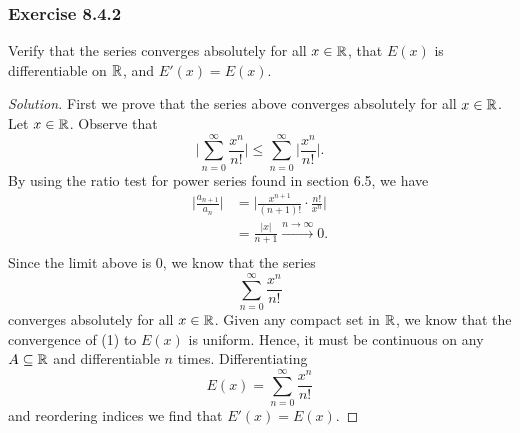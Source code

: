 \subsubsection{Exercise 8.4.2} Verify that the series converges absolutely for all \( x \in \mathbb{R}  \), that \( E(x)  \) is differentiable on \( \mathbb{R}  \), and \( E'(x) = E(x)  \).
\begin{proof}[Solution]
First we prove that the series above converges absolutely for all \( x \in \mathbb{R}  \). Let \( x \in \mathbb{R}  \). Observe that 
\[  \Big| \sum_{ n=0  }^{ \infty  } \frac{ x^{n}  }{  n!  }  \Big| \leq \sum_{ n=0  }^{ \infty  } \Big| \frac{ x^{n}  }{ n!  }  \Big|.    \] By using the ratio test for power series found in section 6.5, we have
\begin{align*}
    \Big| \frac{ a_{n+1} }{ a_{n} }  \Big| &= \Big| \frac{ x^{n+1} }{ (n+1)!  } \cdot \frac{ n!  }{ x^{n} }  \Big|  \\
                                           &= \frac{ | x  |  }{ n+1  } \xrightarrow{n\rightarrow\infty} 0. \\
\end{align*}
Since the limit above is \(  0  \), we know that the series 
\[  \sum_{ n=0  }^{ \infty  } \frac{ x^{n}  }{  n!  } \tag{1} \] converges absolutely for all \( x \in \mathbb{R}  \). Given any compact set in \( \mathbb{R}  \), we know that the convergence of (1) to \( E(x)  \) is uniform. Hence, it must be continuous on any \( A \subseteq \mathbb{R}  \) and differentiable \( n  \) times. Differentiating 
\[  E(x) = \sum_{ n= 0 }^{ \infty  } \frac{ x^{n}  }{ n!  }  \] and reordering indices we find that \( E'(x) = E(x)  \).
\end{proof}

